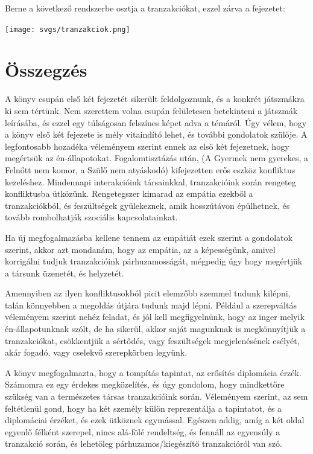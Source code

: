\documentclass[a4paper,12pt]{article}
\begin{document}
	Berne a következő rendszerbe osztja a tranzakciókat, ezzel zárva a fejezetet:\\[0.2cm]

	\begin{center}
		\texttt{[image: svgs/tranzakciok.png]} \\[0.5cm]
	\end{center}

	\section{Összegzés}
	A könyv csupán első két fejezetét sikerült feldolgoznunk, és a konkrét játszmákra ki sem tértünk. Nem szerettem volna csupán felületesen betekinteni a játszmák leírásába, és ezzel egy túlságosan felszínes képet adva a témáról. Úgy vélem, hogy a könyv első két fejezete is mély vitaindító lehet, és további gondolatok szülője. A legfontosabb hozadéka véleményem szerint ennek az első két fejezetnek, hogy megértsük az én-állapotokat. Fogalomtisztázás után, (A Gyermek nem gyerekes, a Felnőtt nem komor, a Szülő nem atyáskodó) kifejezetten erős eszköz konfliktus kezeléshez. Mindennapi interakcióink társainkkal, tranzakcióink során rengeteg konfliktusba ütközünk. Rengetegszer kimarad az empátia ezekből a tranzakciókból, és feszültségek gyülekeznek, amik hosszútávon épülhetnek, és tovább rombolhatják szociális kapcsolatainkat.
	
	Ha új megfogalmazásba kellene tennem az empátiát ezek szerint a gondolatok szerint, akkor azt mondanám, hogy az empátia, az a képességünk, amivel korrigálni tudjuk tranzakcióink párhuzamosságát, mégpedig úgy hogy megértjük a társunk üzenetét, és helyzetét.
	
	Amennyiben az ilyen konfliktusokból picit elemzőbb szemmel tudunk kilépni, talán könnyebben a megoldás útjára tudunk majd lépni. Például a szerepváltás véleményem szerint nehéz feladat, és jól kell megfigyelnünk, hogy az inger melyik én-állapotunknak szólt, de ha sikerül, akkor saját magunknak is megkönnyítjük a tranzakciókat, csökkentjük a sértődés, vagy feszültségek megjelenésének esélyét, akár fogadó, vagy cselekvő szerepkörben legyünk.
	
	A könyv megfogalmazta, hogy a tompítás tapintat, az erősítés diplomácia érzék. Számomra ez egy érdekes megközelítés, és úgy gondolom, hogy mindkettőre szükség van a természetes társas tranzakcióink során. Véleményem szerint, az sem feltétlenül gond, hogy ha két személy külön reprezentálja a tapintatot, és a diplomáciai érzéket, és ezek ütköznek egymással. Egészen addig, amíg a két oldal egyenlő félként szerepel, nincs alá-fölé rendeltség, és fennáll az egyensúly a tranzakció során, és lehetőleg párhuzamos/kiegészítő tranzakcióról van szó.
	
\end{document}
